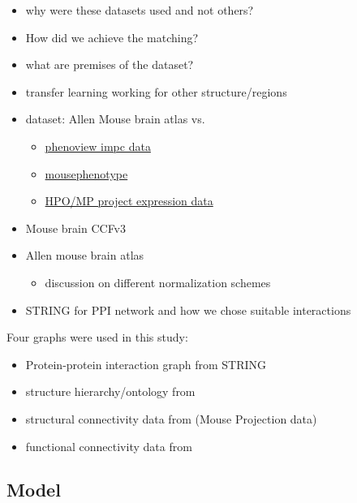 \documentclass[]{article}
\renewcommand{\cite}{\citep}
\begin{document}
\begin{itemize}
	\item why were these datasets used and not others?
	\item How did we achieve the matching?
	\item what are premises of the dataset?
	
	\item transfer learning working for other structure/regions
	\item dataset: Allen Mouse brain atlas vs. 
	\begin{itemize}
		\item \href{https://www.har.mrc.ac.uk/harwell-news/phenoview-new-tool-compare-impc-data/}{phenoview impc data}
		
		\item \href{https://www.mousephenotype.org/}{mousephenotype}
		
		\item \href{http://www.informatics.jax.org/expression.shtml}{HPO/MP project expression data}
	\end{itemize}
	\item Mouse brain CCFv3
\end{itemize}
\begin{itemize}
	\item Allen mouse brain atlas \cite{MouseBrainAtlas}
	\begin{itemize}
		\item discussion on different normalization schemes
	\end{itemize}
	\item STRING for PPI network and how we chose suitable interactions \cite{STRINGv10}
\end{itemize}

Four graphs were used in this study:
\begin{itemize}
	\item Protein-protein interaction graph from STRING
	\item structure hierarchy/ontology from \cite{MouseBrainAtlas}
	\item structural connectivity data from (Mouse Projection data)
	\item functional connectivity data from \cite{AIDAmri2019}
\end{itemize}

\subsection{Model}
\label{sec:modeldesc}
\end{document}
